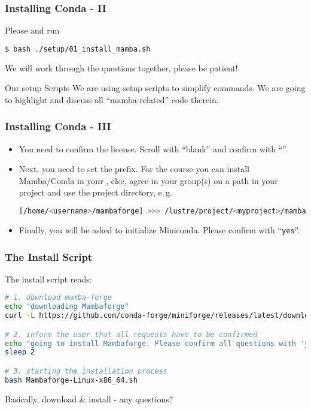 \begin{frame}[fragile]
  \frametitle{Installing Conda - II}
  Please and run
  \begin{lstlisting}[language=Bash, style=Shell]
$ bash ./setup/01_install_mamba.sh
  \end{lstlisting}
  We will work through the questions together, please be patient!
  \begin{block}{Our setup Scripts}
   We are using setup scripts to simplify commands. We are going to highlight and discuss all ``mamba-related'' code therein.
  \end{block}
\end{frame}

\begin{frame}[fragile]
  \frametitle{Installing Conda - III}
  \begin{itemize}[<+->]
   \item You need to confirm the license. Scroll with ``blank'' and confirm with ``''.
   \item Next, you need to set the prefix. For the course you can install Mamba/Conda in your , else, agree in your group(s) on a path in your project and use the project directory, e.\,g. 
   \begin{lstlisting}[language=Bash, style=Shell, breaklines=true ]
[/home/<username>/mambaforge] >>> /lustre/project/<myproject>/mambaforge
   \end{lstlisting}
   \item Finally, you will be asked to initialize Miniconda. Please confirm with ``\verb+yes+''.
  \end{itemize}
\end{frame}

\begin{frame}[fragile]
  \frametitle{The Install Script}
  The install script reads:
  \begin{lstlisting}[language=Bash, style=Shell]
# 1. download mamba-forge
echo "downloading Mambaforge"
curl -L https://github.com/conda-forge/miniforge/releases/latest/download/Mambaforge-Linux-x86_64.sh -o Mambaforge-Linux-x86_64.sh

# 2. inform the user that all requests have to be confirmed
echo "going to install Mambaforge. Please confirm all questions with 'yes'"
sleep 2

# 3. starting the installation process
bash Mambaforge-Linux-x86_64.sh
  \end{lstlisting}
  Basically, download \& install - any questions?
\end{frame}

